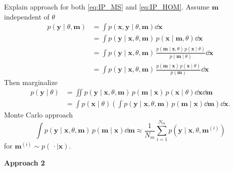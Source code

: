 \documentclass[10pt]{article}
\begin{document}
Explain approach for both \eqref{eq:IP_MS} and \eqref{eq:IP_HOM}.
Assume $\mathbf m$ independent of $\theta$
\begin{equation}
\begin{aligned}
	p(\mathbf y \mid \theta, \mathbf m) &= \int p(\mathbf x , \mathbf y \mid \theta, \mathbf m) \dd \mathbf x\\
	&= \int p(\mathbf y \mid \mathbf x, \theta, \mathbf m) \, p(\mathbf x \mid \mathbf m, \theta) \dd \mathbf x \\
	&= \int p(\mathbf y \mid \mathbf x, \theta, \mathbf m) \, \frac{p(\mathbf m\mid \mathbf x, \theta) \, p(\mathbf x \mid \theta)}{p(\mathbf m \mid \theta)} \dd \mathbf x\\
	&= \int p(\mathbf y \mid \mathbf x, \theta, \mathbf m) \, \frac{p(\mathbf m\mid \mathbf x) \, p(\mathbf x \mid \theta)}{p(\mathbf m)} \dd \mathbf x
\end{aligned}
\end{equation}
Then marginalize
\begin{equation}
\begin{aligned}
	p(\mathbf y \mid \theta) &= \iint p(\mathbf y \mid \mathbf x, \theta, \mathbf m) \, p(\mathbf m\mid \mathbf x) \, p(\mathbf x \mid \theta) \dd \mathbf x \dd \mathbf m\\
	&= \int p(\mathbf x \mid \theta) \left(\int p(\mathbf y \mid \mathbf x, \theta, \mathbf m) \, p(\mathbf m\mid \mathbf x) \dd \mathbf m \right) \dd \mathbf x.
\end{aligned}
\end{equation}
Monte Carlo approach
\begin{equation}
	\int p(\mathbf y \mid \mathbf x, \theta, \mathbf m) \, p(\mathbf m\mid \mathbf x) \dd \mathbf m \approx \frac{1}{N_m} \sum_{i=1}^{N_m} p(\mathbf y \mid \mathbf x, \theta, \mathbf m^{(i)})
\end{equation}
for $\mathbf m^{(i)} \sim p(\,\cdot \mid \mathbf x)$.

\textbf{Approach 2}
\end{document}
